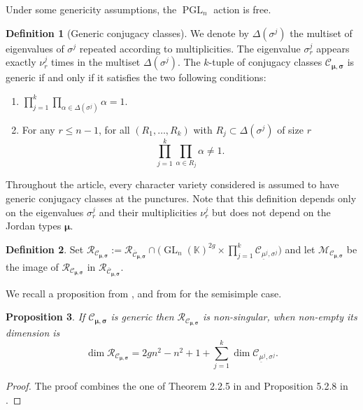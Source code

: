 \documentclass[11pt]{article}
\theoremstyle{definition}
\newtheorem{definition}{Definition}[section]
\theoremstyle{plain}
\newtheorem{proposition}[definition]{Proposition}
\DeclareMathOperator{\GL}{GL}
\DeclareMathOperator{\PGL}{PGL}
\newcommand\KK{\mathbb K }
\begin{document}
Under some genericity assumptions, the $\PGL_n$ action is free.
\begin{definition}[Generic conjugacy classes]\label{def_generic_class}
We denote by $\Delta(\sigma^j)$ the multiset of eigenvalues of $\sigma^j$ repeated according to multiplicities. The eigenvalue $\sigma^j_r$ appears exactly $\nu^j_r$ times in the multiset $\Delta(\sigma^j)$. The $k$-tuple of conjugacy classes $\mathcal{C}_{\boldsymbol{\mu},\boldsymbol{\sigma}}$ is generic if and only if it satisfies the two following conditions:
\begin{enumerate}
\item\enspace
$\displaystyle\prod_{j=1}^k\prod_{\alpha \in \Delta (\sigma^j)}\alpha = 1$.
\item For any $r \le n-1$, for all $(R_1,\dots, R_k)$ with $R_j\subset \Delta(\sigma^j)$ of size $r$
\[
\prod_{j=1}^k \prod_{\alpha\in R_j} \alpha \ne 1.
\]
\end{enumerate}
Throughout the article, every character variety considered is assumed to have generic conjugacy classes at the punctures. Note that this definition depends only on the eigenvalues $\sigma^j_r$ and their multiplicities $\nu_r^j$ but does not depend on the Jordan types $\boldsymbol{\mu}$.
\end{definition}

\begin{definition}
Set $\mathcal{R}_{\mathcal{C}_{\boldsymbol{\mu},\boldsymbol{\sigma}}}:=\mathcal{R}_{\overline{\mathcal{C}}_{\boldsymbol{\mu},\boldsymbol{\sigma}}} \cap\bigl(\GL_n(\KK)^{2 g}\times \prod_{j=1}^k \mathcal{C}_{\underline{\mu}^j,\sigma^j}\bigr)$ and let $\mathcal{M}_{\mathcal{C}_{\boldsymbol{\mu},\boldsymbol{\sigma}}} $ be the image of $\mathcal{R}_{\mathcal{C}_{\boldsymbol{\mu},\boldsymbol{\sigma}}}$ in $\mathcal{R}_{\overline{\mathcal{C}}_{\boldsymbol{\mu},\boldsymbol{\sigma}}}$.
\end{definition}

We recall a proposition from \cite{Letellier13}, and from \cite{Hausel_Letellier_Villegas} for the semisimple case.

\begin{proposition}\label{prop_smooth}
If $\mathcal{C}_{\boldsymbol{\mu},\boldsymbol{\sigma}}$ is generic then $\mathcal{R}_{\mathcal{C}_{\boldsymbol{\mu},\boldsymbol{\sigma}}}$ is non-singular, when non-empty its dimension is
\[
\dim \mathcal{R}_{\mathcal{C}_{\boldsymbol{\mu},\boldsymbol{\sigma}}} = 2 g n^2 -n^2 +1 +\sum_{j=1}^k \dim \mathcal{C}_{\underline{\mu}^j,\sigma^j}.
\]
\end{proposition}
\begin{proof}
The proof combines the one of Theorem 2.2.5 in \cite{Hausel_Villegas} and Proposition 5.2.8 in \cite{Etingof_Oblomkov_Rains}.
\end{proof}
\end{document}
